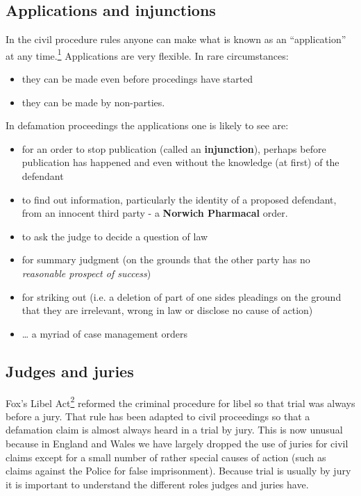 \documentclass[]{article}
\begin{document}
\subsection{Applications and injunctions}

{In the civil procedure rules anyone can make what is known as an
``application'' at any
time}{{.\hyperref[sdfootnote1sym]{\textsuperscript{1}} Applications are
very flexible. In rare circumstances:}}

\begin{itemize}
\item
  they can be made even before procedings have started
\item
  they can be made by non-parties.
\end{itemize}

In defamation proceedings the applications one is likely to see are:

\begin{itemize}
\item
  {{for an order to stop publication (called an
  }}{\textbf{injunction}}{{), perhaps before publication has happened
  and even without the knowledge (at first) of the defendant}}
\item
  {{to find out information, particularly the identity of a proposed
  defendant, from an innocent third party - a }}{\textbf{Norwich
  Pharmacal} }{{order.}}
\item
  to ask the judge to decide a question of law
\item
  {{for summary judgment (on the grounds that the other party has no
  }}\emph{{reasonable prospect of success}}{{)}}
\item
  for striking out (i.e. a deletion of part of one sides pleadings on
  the ground that they are irrelevant, wrong in law or disclose no cause
  of action)
\item
  \ldots{} a myriad of case management orders
\end{itemize}

\subsection{Judges and juries}

{Fox's Libel Act\hyperref[sdfootnote2sym]{\textsuperscript{2}} reformed
the criminal procedure for libel so that trial was always before a jury.
That rule has been adapted to civil proceedings so that a defamation
claim is almost always heard in a trial by jury. This is now unusual
because in England and Wales we have largely dropped the use of juries
for civil claims except for a small number of rather special causes of
action (such as claims against the Police for false imprisonment).
Because trial is usually by jury it is important to understand the
different roles judges and juries have.}
\end{document}
